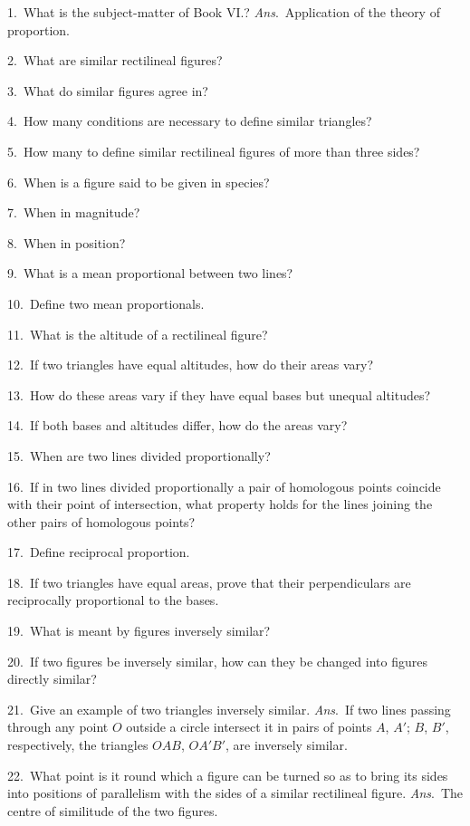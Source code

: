 \documentclass[oneside]{book}
\begin{document}
\begin{footnotesize}
1.~What is the subject-matter of Book VI\@.? \textit{Ans}.\ Application
of the theory of proportion.

2.~What are similar rectilineal figures?

3.~What do similar figures agree in?

4.~How many conditions are necessary to define similar triangles?

5.~How many to define similar rectilineal figures of more
than three sides?

6.~When is a figure said to be given in species?

7.~When in magnitude?

8.~When in position?

9.~What is a mean proportional between two lines?

10.~Define two mean proportionals.

11.~What is the altitude of a rectilineal figure?

12.~If two triangles have equal altitudes, how do their areas
vary?

13.~How do these areas vary if they have equal bases but unequal altitudes?

14.~If both bases and altitudes differ, how do the areas vary?

15.~When are two lines divided proportionally?

16.~If in two lines divided proportionally a pair of homologous
points coincide with their point of intersection, what property
holds for the lines joining the other pairs of homologous
points?

17.~Define reciprocal proportion.

18.~If two triangles have equal areas, prove that their perpendiculars
are reciprocally proportional to the bases.

19.~What is meant by figures inversely similar?

20.~If two figures be inversely similar, how can they be
changed into figures directly similar?

21.~Give an example of two triangles inversely similar. \textit{Ans}.\
If two lines passing through any point $O$ outside a circle intersect
it in pairs of points $A$, $A'$; $B$, $B'$, respectively, the triangles
$OAB$, $OA'B'$, are inversely similar.

22.~What point is it round which a figure can be turned so as
to bring its sides into positions of parallelism with the sides of a
similar rectilineal figure. \textit{Ans}.\ The centre of similitude of the
two figures.


\end{footnotesize}
\end{document}
